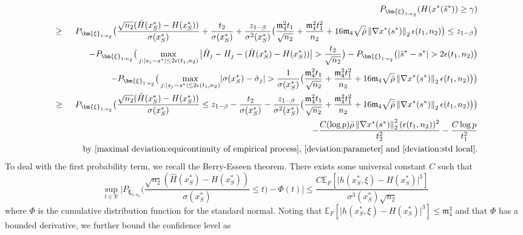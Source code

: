 \documentclass[mnsc,blindrev]{informs4} %
\newcommand{\R}{\mathbb{R}}
\newcommand{\norm}[1]{\left \Vert #1 \right\Vert}
\begin{document}
\begin{eqnarray*}
&&P_{\bm{\xi}_{1:n_2}}(H(x^*(\hat s^*))\geq \gamma)\\
&\geq&P_{\bm{\xi}_{1:n_2}}\big(\frac{\sqrt{n_2}(\hat H(x^*_S)-H(x^*_S))}{\sigma(x^*_S)}+\frac{t_2}{\sigma(x^*_S)}+\frac{z_{1-\beta}}{\sigma^2(x^*_S)}\big(\frac{\mathfrak{m}_4^2t_1}{\sqrt{n_2}}+\frac{\mathfrak{m}_4^2t_1^2}{n_2}+16\mathfrak{m}_4 \sqrt{\bar{\rho}}\norm{\nabla x^*(s^*)}_2\epsilon(t_1,n_2)\big)\leq z_{1-\beta}\big)\\
&&\hspace{5ex}-P_{\bm{\xi}_{1:n_2}}\big(\max_{j:\lvert s_j-s^*\rvert\leq 2\epsilon(t_1,n_2)}\big\lvert\hat H_j-H_j-(\hat H(x^*_S)-H(x^*_S))\big\rvert>\frac{t_2}{\sqrt{n_2}}\big)-P_{\bm{\xi}_{1:n_2}}\big(\lvert \hat s^*-s^*\rvert> 2\epsilon(t_1,n_2)\big)\\
&&\hspace{5ex}-P_{\bm{\xi}_{1:n_2}}\big(\max_{j:\lvert s_j-s^*\rvert\leq 2\epsilon(t_1,n_2)}\lvert \sigma(x^*_S)- \hat \sigma_j\rvert> \frac{1}{\sigma(x^*_S)}\big(\frac{\mathfrak{m}_4^2t_1}{\sqrt{n_2}}+\frac{\mathfrak{m}_4^2t_1^2}{n_2}+16\mathfrak{m}_4 \sqrt{\bar{\rho}}\norm{\nabla x^*(s^*)}_2\epsilon(t_1,n_2)\big)\big)\\
&\geq&P_{\bm{\xi}_{1:n_2}}\big(\frac{\sqrt{n_2}(\hat H(x^*_S)-H(x^*_S))}{\sigma(x^*_S)}\leq z_{1-\beta}-\frac{t_2}{\sigma(x^*_S)}-\frac{z_{1-\beta}}{\sigma^2(x^*_S)}\big(\frac{\mathfrak{m}_4^2t_1}{\sqrt{n_2}}+\frac{\mathfrak{m}_4^2t_1^2}{n_2}+16\mathfrak{m}_4 \sqrt{\bar{\rho}}\norm{\nabla x^*(s^*)}_2\epsilon(t_1,n_2)\big)\big)\\
&&\hspace{5ex}-\frac{C(\log p) \bar{\rho}\norm{\nabla x^*(s^*)}_2^2(\epsilon(t_1,n_2))^2}{t_2^2}-\frac{C\log p}{t_1^2}\\
&&\text{\ \ \ by \eqref{maximal deviation:equicontinuity of empirical process}, \eqref{deviation:parameter} and \eqref{deviation:std local}}.
\end{eqnarray*}
To deal with the first probability term, we recall the Berry-Esseen theorem. There exists some universal constant $C$ such that
\begin{equation*}
   \sup_{t\in\R}\lvert P_{\bm{\xi}_{1:n_2}}\big(\frac{\sqrt{n_2}(\hat H(x^*_S)-H(x^*_S))}{\sigma(x^*_S)}\leq t\big)- \Phi(t)\rvert\leq \frac{C\mathbb E_F[\lvert h(x^*_S,\xi)-H(x^*_S)\rvert^3]}{\sigma^3(x^*_S)\sqrt{n_2}}
\end{equation*}
where $\Phi$ is the cumulative distribution function for the standard normal. Noting that $\mathbb E_F[\lvert h(x^*_S,\xi)-H(x^*_S)\rvert^3]\leq \mathfrak{m}_4^3$ and that $\Phi$ has a bounded derivative, we further bound the confidence level as
\end{document}
